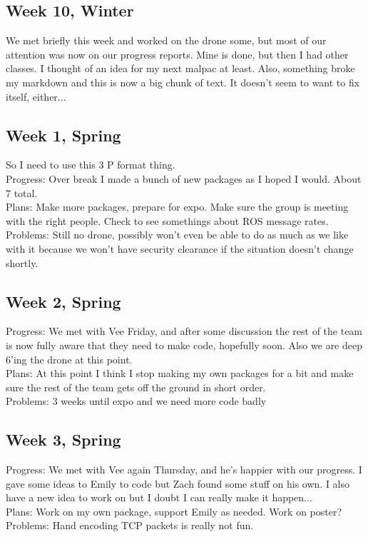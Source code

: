 \documentclass[IEEEtran,letterpaper,10pt,notitlepage,draftclsnofoot,onecolumn]{article}
\begin{document}
\begin{sloppypar}
\subsection{Week 10, Winter}
We met briefly this week and worked on the drone some, but most of our 
attention was now on our progress reports. Mine is done, but then I had other
classes. I thought of an idea for my next malpac at least. Also, something broke
my markdown and this is now a big chunk of text. It doesn't seem to want to fix 
itself, either...
\subsection{Week 1, Spring}
So I need to use this 3 P format thing.\\
Progress: Over break I made a bunch of new packages as I hoped I would. 
About 7 total.\\
Plans: Make more packages, prepare for expo. Make sure the group is 
meeting with the right people. Check to see somethings about ROS message rates. \\
Problems: Still no drone, possibly won't even be able to do as much as we like 
with it because we won't have security clearance if the situation doesn't 
change shortly.\\
\subsection{Week 2, Spring}
Progress: We met with Vee Friday, and after some discussion the rest of the 
team is now fully aware that they need to make code, hopefully soon. Also we are 
deep 6'ing the drone at this point.\\
Plans: At this point I think I stop making my own packages for a bit and make 
sure the rest of the team gets off the ground in short order.\\
Problems: 3 weeks until expo and we need more code badly\\
\subsection{Week 3, Spring}
Progress: We met with Vee again Thursday, and he's happier with our progress. 
I gave some ideas to Emily to code but Zach found some stuff on his own. 
I also have a new idea to work on but I doubt I can really make it happen...\\
Plans: Work on my own package, support Emily as needed. Work on poster?\\
Problems: Hand encoding TCP packets is really not fun.\\

\end{sloppypar}
\end{document}
